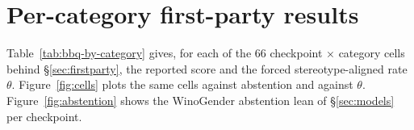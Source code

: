 \section{Per-category first-party results}
\label{app:categories}









Table~\ref{tab:bbq-by-category} gives, for each of the 66 checkpoint $\times$
category cells behind \S\ref{sec:firstparty}, the reported score and the
forced stereotype-aligned rate $\theta$. Figure~\ref{fig:cells} plots the same
cells against abstention and against $\theta$. Figure~\ref{fig:abstention}
shows the WinoGender abstention lean of \S\ref{sec:models} per checkpoint.


